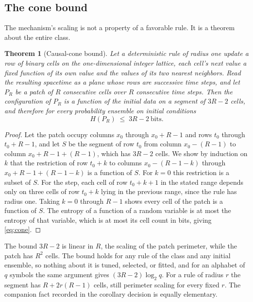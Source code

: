\documentclass[aps,pre,reprint,nofootinbib]{revtex4-2}
\newtheorem{theorem}{Theorem}
\begin{document}
\subsection{The cone bound}

The mechanism's scaling is not a property of a favorable rule.  It is a
theorem about the entire class.

\begin{theorem}[Causal-cone bound]
\label{thm:cone}
Let a deterministic rule of radius one update a row of binary cells on
the one-dimensional integer lattice, each cell's next value a fixed
function of its own value and the values of its two nearest neighbors.
Read the resulting spacetime as a plane whose rows are successive time
steps, and let $P_R$ be a patch of $R$ consecutive cells over $R$
consecutive time steps.  Then the configuration of $P_R$ is a function
of the initial data on a segment of $3R - 2$ cells, and therefore for
every probability ensemble on initial conditions
\begin{equation}
  H(P_R) \;\le\; 3R - 2 \ \text{bits}.
  \label{eq:cone}
\end{equation}
\end{theorem}

\begin{proof}
Let the patch occupy columns $x_0$ through $x_0 + R - 1$ and rows $t_0$
through $t_0 + R - 1$, and let $S$ be the segment of row $t_0$ from
column $x_0 - (R-1)$ to column $x_0 + R - 1 + (R-1)$, which has
$3R - 2$ cells.  We show by induction on $k$ that the restriction of row
$t_0 + k$ to columns $x_0 - (R-1-k)$ through $x_0 + R - 1 + (R-1-k)$ is
a function of $S$.  For $k = 0$ this restriction is a subset of $S$.
For the step, each cell of row $t_0 + k + 1$ in the stated range depends
only on three cells of row $t_0 + k$ lying in the previous range, since
the rule has radius one.  Taking $k = 0$ through $R - 1$ shows every
cell of the patch is a function of $S$.  The entropy of a function of a
random variable is at most the entropy of that variable, which is at
most its cell count in bits, giving \eqref{eq:cone}.
\end{proof}

The bound $3R - 2$ is linear in $R$, the scaling of the patch perimeter,
while the patch has $R^2$ cells.  The bound holds for any rule of the
class and any initial ensemble, so nothing about it is tuned, selected,
or fitted, and for an alphabet of $q$ symbols the same argument gives
$(3R-2)\log_2 q$.  For a rule of radius $r$ the segment has
$R + 2r(R-1)$ cells, still perimeter scaling for every fixed $r$.  The
companion fact recorded in the corollary decision is equally elementary.
\end{document}
